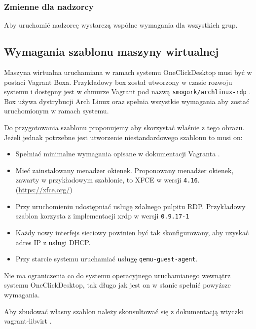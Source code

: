 \documentclass[../opis-rozwiazania.tex]{subfiles}
\begin{document}
\subsubsection{Zmienne dla nadzorcy}
Aby uruchomić nadzorcę wystarczą wspólne wymagania dla wszystkich grup.

\subsection{Wymagania szablonu maszyny wirtualnej}
\label{system_requirements.vagrant_box}
Maszyna wirtualna uruchamiana w ramach systemu OneClickDesktop musi być w postaci Vagrant Boxa.
Przykładowy box został utworzony w czasie rozwoju systemu i dostępny jest w chmurze Vagrant pod nazwą \texttt{smogork/archlinux-rdp} \parencite{ocd-vbox}.
Box używa dystrybucji Arch Linux oraz spełnia wszystkie wymagania aby zostać uruchomionym w ramach systemu.

Do przygotowania szablonu proponujemy aby skorzystać właśnie z tego obrazu.
Jeżeli jednak potrzebne jest utworzenie niestandardowego szablonu to musi on:
\begin{itemize}
  \item Spełniać minimalne wymagania opisane w dokumentacji Vagranta \parencite{vagrant-basebox}.
  \item Mieć zainstalowany menadżer okienek. Proponowany menadżer okienek, zawarty w przykładowym szablonie, to XFCE w wersji \texttt{4.16}. (\url{https://xfce.org/})
  \item Przy uruchomieniu udostępniać usługę zdalnego pulpitu RDP. Przykładowy szablon korzysta z implementacji xrdp w wersji \texttt{0.9.17-1}
  \item Każdy nowy interfejs sieciowy powinien być tak skonfigurowany, aby uzyskać adres IP z usługi DHCP.
  \item Przy starcie systemu uruchamiać usługę \texttt{qemu-guest-agent}.
\end{itemize}
Nie ma ograniczenia co do systemu operacyjnego uruchamianego wewnątrz systemu OneClickDesktop, tak długo jak jest on w stanie spełnić powyższe wymagania.

Aby zbudować własny szablon należy skonsultować się z dokumentacją wtyczki vagrant-libvirt \parencite{vlibvirt-box}.
\end{document}
